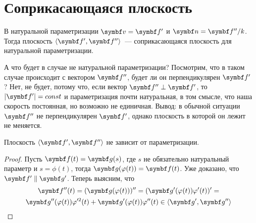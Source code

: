 \documentclass[main]{subfiles}
\begin{document}
\chapter{Соприкасающаяся плоскость}
В натуральной параметризации $\vv = \vf'$ и $\vn = \vf''/k$.
Тогда плоскость $\langle \vf', \vf''\rangle$~--- соприкасающаяся плоскость для натуральной параметризации.

А что будет в случае не натуральной параметризации?
Посмотрим, что в таком случае происходит с вектором $\vf''$, будет ли он перпендикулярен $\vf'$?
Нет, не будет, потому что, если вектор $\vf'' \perp \vf'$, то $|\vf'| = const$
и параметризация почти натуральная, в том смысле, что наша скорость постоянная, но возможно не единичная.
Вывод: в обычной ситуации $\vf''$ не перпендикулярен $\vf'$, однако плоскость в которой он лежит не меняется.

\begin{theorem}
    Плоскость $\langle \vf', \vf''\rangle$ не зависит от параметризации.
\end{theorem}
\begin{proof}
    Пусть $\vf(t) = \vg(s)$, где $s$ не обязательно натуральный параметр и $s = \phi(t)$, тогда $\vg(\phi(t)) = \vf(t)$.
    Уже доказано, что $\vf' \parallel \vg'$.
    Теперь выясним, что
    \begin{multline*}
        \vf''(t) = (\vg(\phi(t)))'' = (\vg'(\phi(t)) \phi'(t))' = \\
        \vg''(\phi(t)) \phi'^2(t) + \vg'(\phi(t)) \phi''(t) \in \langle \vg', \vg''\rangle
    \end{multline*}
\end{proof}
\end{document}
